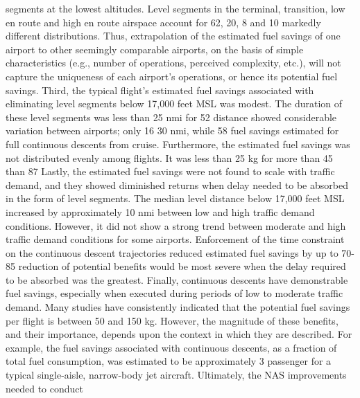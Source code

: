 \documentclass{aer1315-pretty}
\begin{document}
\begin{itemize}
segments at the lowest altitudes. Level segments in the terminal, transition, low en route and high en route airspace
account for 62, 20, 8 and 10%
markedly different distributions. Thus, extrapolation of the estimated fuel savings of one airport to other seemingly
comparable airports, on the basis of simple characteristics (e.g., number of operations, perceived complexity, etc.),
will not capture the uniqueness of each airport’s operations, or hence its potential fuel savings.
    Third, the typical flight’s estimated fuel savings associated with eliminating level segments below 17,000 feet
MSL was modest. The duration of these level segments was less than 25 nmi for 52%
distance showed considerable variation between airports; only 16%
30 nmi, while 58%
fuel savings estimated for full continuous descents from cruise. Furthermore, the estimated fuel savings was not
distributed evenly among flights. It was less than 25 kg for more than 45%
than 87%
    Lastly, the estimated fuel savings were not found to scale with traffic demand, and they showed diminished
returns when delay needed to be absorbed in the form of level segments. The median level distance below 17,000
feet MSL increased by approximately 10 nmi between low and high traffic demand conditions. However, it did not
show a strong trend between moderate and high traffic demand conditions for some airports. Enforcement of the
time constraint on the continuous descent trajectories reduced estimated fuel savings by up to 70-85%
reduction of potential benefits would be most severe when the delay required to be absorbed was the greatest.
    Finally, continuous descents have demonstrable fuel savings, especially when executed during periods of low to
moderate traffic demand. Many studies have consistently indicated that the potential fuel savings per flight is
between 50 and 150 kg. However, the magnitude of these benefits, and their importance, depends upon the context
in which they are described. For example, the fuel savings associated with continuous descents, as a fraction of total
fuel consumption, was estimated to be approximately 3%
passenger for a typical single-aisle, narrow-body jet aircraft. Ultimately, the NAS improvements needed to conduct

\end{itemize}
\end{document}
